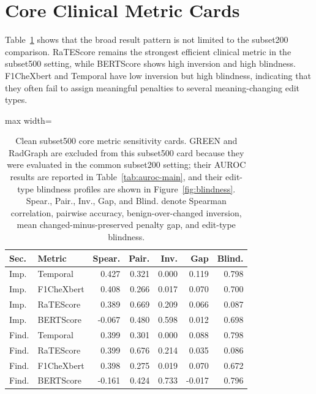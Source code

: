 \documentclass[11pt]{article}
\begin{document}
\section{Core Clinical Metric Cards}
\label{app:corecards}

Table~\ref{tab:subset500-core} shows that the broad result pattern is not limited to the subset200 comparison. 
RaTEScore remains the strongest efficient clinical metric in the subset500 setting, while BERTScore shows high inversion and high blindness. 
F1CheXbert and Temporal have low inversion but high blindness, indicating that they often fail to assign meaningful penalties to several meaning-changing edit types.

\begin{table}[H]
\centering
\scriptsize
\setlength{\tabcolsep}{2pt}
\begin{adjustbox}{max width=\columnwidth}
\begin{tabular}{llrrrrr}
\toprule
\textbf{Sec.} & \textbf{Metric} & \textbf{Spear.} & \textbf{Pair.} & \textbf{Inv.} & \textbf{Gap} & \textbf{Blind.} \\
\midrule
Imp. & Temporal & 0.427 & 0.321 & 0.000 & 0.119 & 0.798 \\
Imp. & F1CheXbert & 0.408 & 0.266 & 0.017 & 0.070 & 0.700 \\
Imp. & RaTEScore & 0.389 & 0.669 & 0.209 & 0.066 & 0.087 \\
Imp. & BERTScore & -0.067 & 0.480 & 0.598 & 0.012 & 0.698 \\
\midrule
Find. & Temporal & 0.399 & 0.301 & 0.000 & 0.088 & 0.798 \\
Find. & RaTEScore & 0.399 & 0.676 & 0.214 & 0.035 & 0.086 \\
Find. & F1CheXbert & 0.398 & 0.275 & 0.019 & 0.070 & 0.672 \\
Find. & BERTScore & -0.161 & 0.424 & 0.733 & -0.017 & 0.796 \\
\bottomrule
\end{tabular}
\end{adjustbox}
\caption{Clean subset500 core metric sensitivity cards. GREEN and RadGraph are excluded from this subset500 card because they were evaluated in the common subset200 setting; their AUROC results are reported in Table~\ref{tab:auroc-main}, and their edit-type blindness profiles are shown in Figure~\ref{fig:blindness}. Spear., Pair., Inv., Gap, and Blind. denote Spearman correlation, pairwise accuracy, benign-over-changed inversion, mean changed-minus-preserved penalty gap, and edit-type blindness.}
\label{tab:subset500-core}
\end{table}
\end{document}
